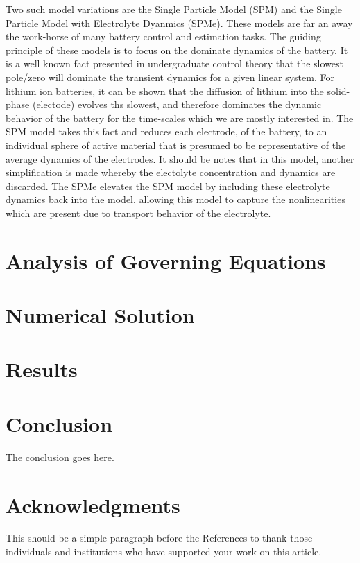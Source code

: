 \documentclass[lettersize,journal]{IEEEtran}
\begin{document}
Two such model variations are the Single Particle Model (SPM) and the Single Particle Model with Electrolyte Dyanmics (SPMe). These models are far an away the work-horse of many battery control and estimation tasks. The guiding principle of these models is to focus on the dominate dynamics of the battery. It is a well known fact presented in undergraduate control theory that the slowest pole/zero will dominate the transient dynamics for a given linear system. For lithium ion batteries, it can be shown that the diffusion of lithium into the solid-phase (electode) evolves ths slowest, and therefore dominates the dynamic behavior of the battery for the time-scales which we are mostly interested in. The SPM model takes this fact and reduces each electrode, of the battery, to an individual sphere of active material that is presumed to be representative of the average dynamics of the electrodes. It should be notes that in this model, another simplification is made whereby the electolyte concentration and dynamics are discarded. The SPMe elevates the SPM model by including these electrolyte dynamics back into the model, allowing this model to capture the nonlinearities which are present due to transport behavior of the electrolyte.



\section{Analysis of Governing Equations}

\section{Numerical Solution}

\section{Results}

\section{Conclusion}
The conclusion goes here.


\section*{Acknowledgments}
This should be a simple paragraph before the References to thank those individuals and institutions who have supported your work on this article.
\end{document}
